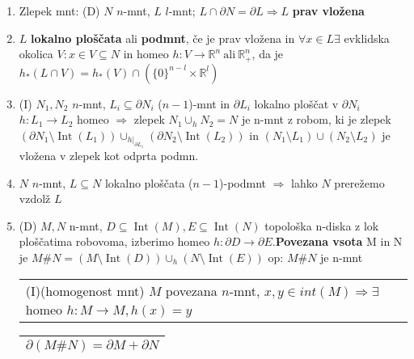 \documentclass[10pt,a4paper]{article}
\DeclareMathOperator{\Int}{Int}
\begin{document}
\begin{enumerate}

\item Zlepek mnt: (D) $N$ $n$-mnt, $L$ $l$-mnt; $L \cap \partial N = \partial L \Rightarrow L$ \textbf{prav vložena} 
\item $L$ \textbf{lokalno ploščata} ali \textbf{podmnt}, če je prav vložena in $\forall x \in L \exists$ evklidska okolica
    $V: x \in V \subseteq N$ in homeo $h: V \rightarrow \mathbb{R}^n~\text{ali}~\mathbb{R}^{n}_+$, da je $h_\ast(L\cap V) = h_\ast(V) \cap (\{0\}^{n-l}\times \mathbb{R}^l)$
\item (I) $N_1, N_2$ $n$-mnt, $L_i \subseteq \partial N_i$ ($n-1$)-mnt in $\partial L_i$ lokalno ploščat v $\partial N_i$ 
    \quad $h: L_1 \rightarrow L_2$ homeo $\Rightarrow$ zlepek $N_1 \cup_h N_2 = N$
    je n-mnt z robom, ki je zlepek $(\partial N_1 \setminus \Int(L_1)) \cup_{h|_{\partial L_1}} (\partial N_2 \setminus \Int(L_2))$ in $(N_1 \setminus L_1) \cup (N_2 \setminus L_2)$ je vložena v zlepek kot odprta podmn.
\item $N$ $n$-mnt, $L \subseteq N$ lokalno ploščata ($n-1$)-podmnt $\Rightarrow$ lahko $N$ prerežemo vzdolž $L$ 
\item (D) $M,N$ n-mnt, $D \subseteq \Int(M), E \subseteq \Int(N)$
topološka n-diska z lok ploščatima robovoma, izberimo homeo $h: \partial D \rightarrow \partial E$.\textbf{Povezana vsota} M in N je $M \# N = (M \setminus \Int(D)) \cup_h (N \setminus \Int(E))$ op: $M \# N$ je n-mnt
   
    
    \begin{tabular}{l}
        (I)(homogenost mnt) $M$ povezana $n$-mnt, $x, y \in int(M) \Rightarrow \exists$ homeo $h: M \rightarrow M, h(x)=y$ \\
    \end{tabular}
    \begin{tabular}{|l|}
        \hline
        \(\partial (M \# N) = \partial M + \partial N\) \\
        \hline
    \end{tabular}
\vspace{1mm}
\noindent\makebox[\linewidth]{\rule{\paperwidth}{0.4pt}} 
\vspace{-6mm}


\end{enumerate}
\end{document}
